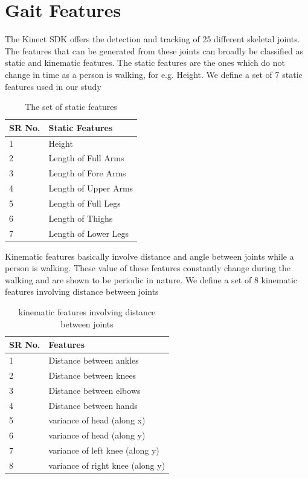 \section{Gait Features} \label{Gait Features } 
\noindent The Kinect SDK offers the detection and tracking of 25 different skeletal joints. The features that can be generated from these joints can broadly be classified as static and kinematic features.
The static features are the ones which do not change in time as a person is walking, for e.g. Height.
We define a set of 7 static features used in our study


\begin{table}
\centering
\begin{tabular}{| l | |p{5cm}|}
 \hline
SR No. & Static Features  \\ \hline
1 & Height \\ \hline
2 & Length of Full Arms \\ \hline
3 & Length of Fore Arms \\\hline
4 & Length of Upper Arms \\ \hline
5 & Length of Full Legs \\ \hline
6 & Length of Thighs \\\hline
7 & Length of Lower Legs \\ \hline

\end{tabular}
\caption{The set of static features}
\end{table}



\noindent Kinematic features basically involve distance and angle between joints while a person is walking. These value of these features constantly change during the walking and are shown to be periodic in nature.
We define a set of 8 kinematic features involving distance between joints 

\begin{table}
\centering
\begin{tabular}{| l | |p{6cm}|}
 \hline
SR No. & Features  \\ \hline
1 & Distance between ankles \\ \hline
2 & Distance between knees \\ \hline
3 & Distance between elbows \\\hline
4 & Distance between hands \\ \hline
5 & variance of head (along x) \\ \hline
6 & variance of head (along y) \\\hline
7 & variance of left knee (along y) \\ \hline
8 & variance of right knee (along y) \\ \hline
\end{tabular}
\caption{ kinematic features involving distance between joints}
\end{table}

